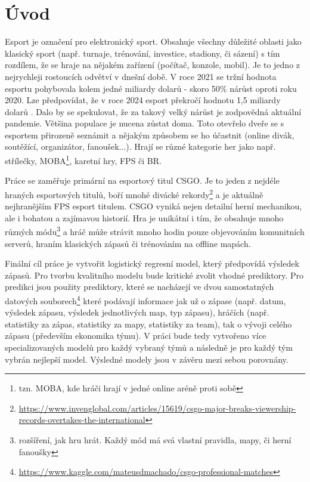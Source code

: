 \chapter{Úvod}
Esport je označení pro elektronický sport. Obsahuje všechny důležité oblasti jako klasický sport (např. turnaje, trénování, investice, stadiony, či sázení)
s tím rozdílem, že se hraje na nějakém zařízení (počítač, konzole, mobil).
Je to jedno z nejrychleji rostoucích odvětví v dnešní době. V roce 2021 se tržní hodnota esportu pohybovala kolem jedné miliardy dolarů - skoro
50\% nárůst oproti roku 2020. Lze předpovídat, že v roce 2024 esport překročí hodnotu 1,5 miliardy dolarů \cite{Gough2021}.
Dalo by se spekulovat, že za takový velký nárůst je zodpovědná aktuální pandemie. Většina populace je nucena zůstat doma. Toto otevřelo dveře
se s esportem přirozeně seznámit a nějakým způsobem se ho účastnit (online divák, soutěžící, organizátor, fanoušek...). 
Hrají se různé kategorie her jako např. střílečky, \ac{MOBA}\footnote{tzn. MOBA, kde hráči hrají v jedné online aréně proti sobě},
karetní hry, \ac{FPS} či \ac{BR}.

Práce se zaměřuje primární na esportový titul \acf{CSGO}. Je to jeden z nejdéle hraných esportových titulů, boří mnohé divácké
rekordy\footnote{\scriptsize \url{https://www.invenglobal.com/articles/15619/csgo-major-breaks-viewership-records-overtakes-the-international}}
a je aktuálně nejhranějším \ac{FPS} esport titulem. \ac{CSGO} vyniká nejen detailní herní mechanikou, ale i bohatou a zajímavou historií. Hra
je unikátní i tím, že obsahuje mnoho různých módu\footnote{rozšíření, jak hru hrát. Každý mód má svá vlastní pravidla, mapy, či herní fanoušky}
a hráč může strávit mnoho hodin pouze objevováním komunitních serverů, hraním klasických zápasů či trénováním na offline mapách.

Finální cíl práce je vytvořit logistický regresní model, který předpovídá výsledek zápasů. Pro tvorbu kvalitního modelu bude kritické zvolit vhodné prediktory.
Pro predikci jsou použity prediktory, které se nacházejí ve dvou samostatných datových souborech\footnote{\url{https://www.kaggle.com/mateusdmachado/csgo-professional-matches}} 
které podávají informace jak už o zápase (např. datum, 
výsledek zápasu, výsledek jednotlivých map, typ zápasu), hráčích (např. statistiky za zápas, statistiky za mapy, statistiky za team), tak o 
vývoji celého zápasu (především ekonomika týmu). V práci bude tedy vytvořeno více specializovaných modelů pro každý vybraný týmů a následně
je pro každý tým vybrán nejlepší model. Výsledné modely jsou v závěru mezi sebou porovnány.

